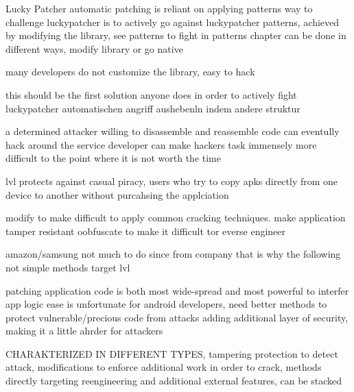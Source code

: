 
Lucky Patcher automatic patching is reliant on applying patterns
%
way to challenge luckypatcher is to actively go against luckypatcher patterns, achieved by modifying the library, see patterns to fight in patterns chapter
can be done in different ways, modify library or go native

many developers do not customize the library, easy to hack
\cite{munteanLicense}
%

this should be the first solution anyone does in order to actively fight luckypatcher
automatischen angriff aushebenln indem andere struktur


a determined attacker willing to disassemble and reassemble code can eventully hack around the service
developer can make hackers task immensely more difficult to the point where it is not worth the time

lvl protects against casual piracy, users who try to copy apks directly from one device to another without purcahsing the applciation

modify to make difficult to apply common cracking techniques.
make application tamper resistant
oobfuscate to make it difficult tor everse engineer


\cite{developersSecuring}

%
amazon/samsung not much to do since from company that is why the following not simple methods target lvl

patching application code is both most wide-spread and most powerful to interfer app logic
ease is unfortunate for android developers, need better methods to protect vulnerable/precious code from attacks
adding additional layer of security, making it a little ahrder for attackers

CHARAKTERIZED IN DIFFERENT TYPES, tampering protection to detect attack, modifications to enforce additional work in order to crack, methods directly targeting reengineering and additional external features, can be stacked
\cite{munteanLicense}
%
